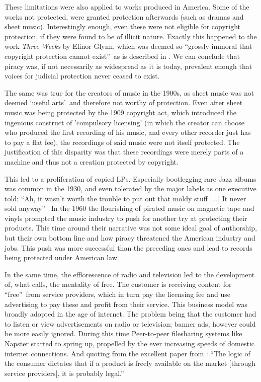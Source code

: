 \documentclass[a4paper]{report}
\begin{document}
These limitations were also applied to works produced in America. Some of the works not protected, were granted protection afterwards (such as dramas and sheet music). Interestingly enough, even these were not eligible for copyright protection, if they were found to be of illicit nature.  Exactly this happened to the work \textit{Three Weeks} by Elinor Glynn, which was deemed so \textquotedblleft grossly immoral that copyright protection cannot exist\textquotedblright\ as is described in \cite{Fox1945}.
We can conclude that piracy was, if not necessarily as widespread as it is today, prevalent enough that voices for judicial protection never ceased to exist.

The same was true for the creators of music in the 1900s, as sheet music was not deemed \textquoteleft useful arts\textquoteright\ and therefore not worthy of protection. Even after sheet music was being protected by the 1909 copyright act, which introduced the ingenious construct of 'compulsory licensing' (in which the creator can choose who produced the first recording of his music, and every other recorder just has to pay a flat fee), the recordings of said music were not itself protected. The justification of this disparity was that these recordings were merely parts of a machine and thus not a creation protected by copyright.

This led to a proliferation of copied LPs. Especially bootlegging rare Jazz albums was common in the 1930, and even tolerated by the major labels as one executive told: \textquotedblleft Ah, it wasn't worth the trouble to put out that moldy stuff [...] It never sold anyway\textquotedblright\ \parencite{Cummings2017}
In the 1960 the flourishing of pirated music on magnetic tape and vinyls prompted the music industry to push for another try at protecting their products. This time around their narrative was not some ideal goal of authorship, but their own bottom line and how piracy threatened the American industry and jobs. This push was more successful than the preceding ones and lead to records being protected under American law.

In the same time, the efflorescence of radio and television led to the development of, what \cite{Lin2013} calls, the mentality of free. The customer is receiving content for \textquotedblleft free\textquotedblright\ from service providers, which in turn pay the licensing fee and use advertising to pay these and profit from their service. This business model was broadly adopted in the age of internet. The problem being that the customer had to listen or view advertisements on radio or television; banner ads, however could be more easily ignored. During this time Peer-to-peer filesharing systems like Napster started to spring up, propelled by the ever increasing speeds of domestic internet connections. And quoting from the excellent paper from \cite{Lunceford2008}: \textquotedblleft The logic of the consumer dictates that if a product is freely available on the market [through service providers], it is probably  legal.\textquotedblright
\end{document}
